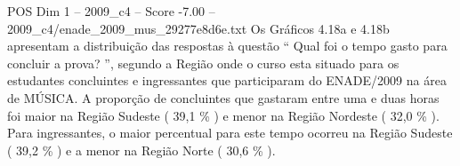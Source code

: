 \begin{textsample}{POS Dim 1 – 2009\_c4 – Score -7.00 – 2009\_c4/enade\_2009\_mus\_29277e8d6e.txt}
Os Gráficos 4.18a e 4.18b apresentam a distribuição das respostas à questão “ Qual foi o tempo gasto para concluir a prova? ”, segundo a Região onde o curso esta situado para os estudantes concluintes e ingressantes que participaram do ENADE/2009 na área de MÚSICA.
A proporção de concluintes que gastaram entre uma e duas horas foi maior na Região Sudeste ( 39,1 \% ) e menor na Região Nordeste ( 32,0 \% ).
Para ingressantes, o maior percentual para este tempo ocorreu na Região Sudeste ( 39,2 \% ) e a menor na Região Norte ( 30,6 \% ).

\end{textsample}
